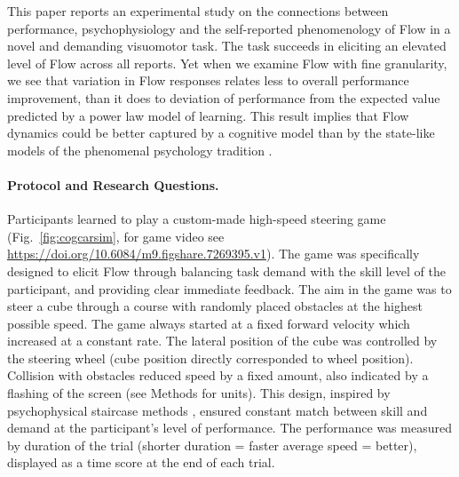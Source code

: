\documentclass[fleqn,10pt]{wlscirep}
\begin{document}
This paper reports an experimental study on the connections between performance, psychophysiology and the self-reported phenomenology of Flow in a novel and demanding visuomotor task. The task succeeds in eliciting an elevated level of Flow across all reports. Yet when we examine Flow with fine granularity, we see that variation in Flow responses relates less to overall performance improvement, than it does to deviation of performance from the expected value predicted by a power law model of learning. This result implies that Flow dynamics could be better captured by a cognitive model than by the state-like models of the phenomenal psychology tradition \cite{Moneta2012}.


\paragraph{Protocol and Research Questions.}

Participants learned to play a custom-made high-speed steering game (Fig.~\ref{fig:cogcarsim}, for game video see \url{https://doi.org/10.6084/m9.figshare.7269395.v1}). The game was specifically designed to elicit Flow through balancing task demand with the skill level of the participant, and providing clear immediate feedback. The aim in the game was to steer a cube through a course with randomly placed obstacles at the highest possible speed. The game always started at a fixed forward velocity which increased at a constant rate. The lateral position of the cube was controlled by the steering wheel (cube position directly corresponded to wheel position). Collision with obstacles reduced speed by a fixed amount, also indicated by a flashing of the screen (see Methods for units).
This design, inspired by psychophysical staircase methods \cite{Cornsweet1962}, ensured constant match between skill and demand at the participant's level of performance. The performance was measured by duration of the trial (shorter duration = faster average speed = better), displayed as a time score at the end of each trial.
\end{document}
